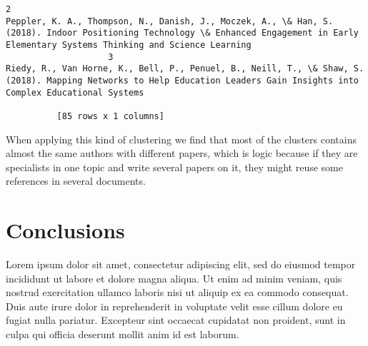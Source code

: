 \documentclass[journal,twocolumn]{IEEEtran}
\begin{document}
\begin{Verbatim}[commandchars=\\\{\}]
                    2                                                                                                                                                                                                                                         Peppler, K. A., Thompson, N., Danish, J., Moczek, A., \& Han, S. (2018). Indoor Positioning Technology \& Enhanced Engagement in Early Elementary Systems Thinking and Science Learning
                    3                                                                                                                                                                                                                                                      Riedy, R., Van Horne, K., Bell, P., Penuel, B., Neill, T., \& Shaw, S. (2018). Mapping Networks to Help Education Leaders Gain Insights into Complex Educational Systems 
          
          [85 rows x 1 columns]
\end{Verbatim}
            

    When applying this kind of clustering we find that most of the clusters
contains almost the same authors with different papers, which is logic
because if they are specialists in one topic and write several papers on
it, they might reuse some references in several documents.

    \section{Conclusions}\label{conclusions}

Lorem ipsum dolor sit amet, consectetur adipiscing elit, sed do eiusmod
tempor incididunt ut labore et dolore magna aliqua. Ut enim ad minim
veniam, quis nostrud exercitation ullamco laboris nisi ut aliquip ex ea
commodo consequat. Duis aute irure dolor in reprehenderit in voluptate
velit esse cillum dolore eu fugiat nulla pariatur. Excepteur sint
occaecat cupidatat non proident, sunt in culpa qui officia deserunt
mollit anim id est laborum.
\newpage

    
    



    
    
\end{document}
